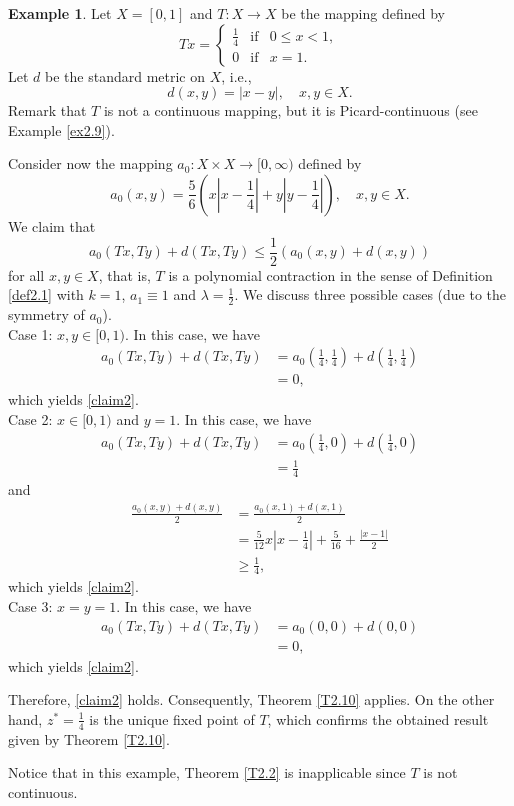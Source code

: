 \documentclass[letterpaper,12pt]{article}
\numberwithin{equation}{section}
\theoremstyle{definition}
\newtheorem{example}[theorem]{Example}
\theoremstyle{remark}
\begin{document}
\begin{example}\label{ex2.10}
Let $X=[0,1]$ and $T: X\to X$ be the mapping defined by 
$$
Tx=\left\{\begin{array}{llll}
\frac{1}{4} &\mbox{if}& 0\leq x<1,\\[4pt]
0 &\mbox{if}& x=1.	
\end{array}
\right.
$$	
Let $d$ be the standard metric on $X$, i.e., 
$$
d(x,y)=|x-y|,\quad x,y\in X. 
$$
Remark that $T$ is not a continuous mapping, but it is Picard-continuous (see Example \ref{ex2.9}).   

Consider now the mapping $a_0: X\times X\to [0,\infty)$ defined by 
$$
a_0(x,y)=\frac{5}{6}\left(x\left|x-\frac{1}{4}\right|+y\left|y-\frac{1}{4}\right|\right),\quad x,y\in X. 
$$
We claim that 
\begin{equation}\label{claim2}
a_0(Tx,Ty)+d(Tx,Ty)\leq \frac{1}{2} \left(a_0(x,y)+d(x,y)\right)	
\end{equation}
for all $x,y\in X$, that is, $T$ is a polynomial contraction in the sense of Definition \ref{def2.1} with $k=1$, $a_1\equiv 1$ and $\lambda=\frac{1}{2}$.  We discuss three possible cases (due to the symmetry of $a_0$). \\
Case 1: $x,y\in [0,1)$.  In this case, we have
$$
\begin{aligned}
a_0(Tx,Ty)+d(Tx,Ty)&=a_0\left(\frac{1}{4},\frac{1}{4}\right)+d\left(\frac{1}{4},\frac{1}{4}\right)\\
&=0,	
\end{aligned}
$$
which yields \eqref{claim2}. \\
Case 2: $x \in [0,1)$ and $y=1$.  In this case, we have
$$
\begin{aligned}
a_0(Tx,Ty)+d(Tx,Ty)&=a_0\left(\frac{1}{4},0\right)+d\left(\frac{1}{4},0\right)\\
&=\frac{1}{4}	
\end{aligned}
$$
and
$$
\begin{aligned}
\frac{a_0(x,y)+d(x,y)}{2}&=\frac{a_0\left(x,1\right)+d\left(x,1\right)}{2}\\
&=\frac{5}{12}x\left|x-\frac{1}{4}\right|+\frac{5}{16}+\frac{|x-1|}{2}\\
&\geq \frac{1}{4},
\end{aligned}
$$
which yields \eqref{claim2}.\\
Case 3: $x=y=1$. In this case, we have
$$
\begin{aligned}
a_0(Tx,Ty)+d(Tx,Ty)&=a_0(0,0)+d\left(0,0\right)\\
&=0,	
\end{aligned}
$$
which yields \eqref{claim2}.

Therefore, \eqref{claim2} holds. Consequently, Theorem \ref{T2.10} applies. On the other hand, $z^*=\frac{1}{4}$ is the unique fixed point of $T$, which confirms the obtained result given by Theorem \ref{T2.10}. 

Notice that in this example, Theorem \ref{T2.2} is inapplicable since $T$ is not  continuous.  
\end{example}
\end{document}

